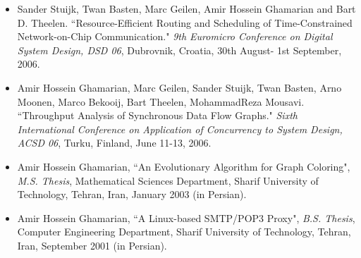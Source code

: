 \begin{itemize}
\item Sander Stuijk, Twan Basten, Marc Geilen, Amir Hossein Ghamarian and Bart D.
Theelen. ``Resource-Efficient Routing and Scheduling of
Time-Constrained Network-on-Chip Communication." \emph{9th Euromicro
Conference on Digital System Design, DSD 06}, Dubrovnik, Croatia,
30th August- 1st September, 2006.

\item Amir Hossein Ghamarian, Marc Geilen, Sander Stuijk, Twan Basten, Arno Moonen, Marco Bekooij, Bart Theelen, MohammadReza Mousavi.
``Throughput Analysis of Synchronous Data Flow Graphs." \emph{Sixth
International Conference on Application of Concurrency to System
Design, ACSD 06}, Turku, Finland, June 11-13, 2006.

\item Amir Hossein Ghamarian, ``An Evolutionary Algorithm for Graph
Coloring", \emph{M.S. Thesis}, Mathematical Sciences Department,
Sharif University of Technology, Tehran, Iran, January 2003 (in
Persian).

\item Amir Hossein Ghamarian, ``A Linux-based SMTP/POP3 Proxy", \emph{B.S.
Thesis}, Computer Engineering Department, Sharif University of
Technology, Tehran, Iran, September 2001 (in Persian).
\end{itemize}